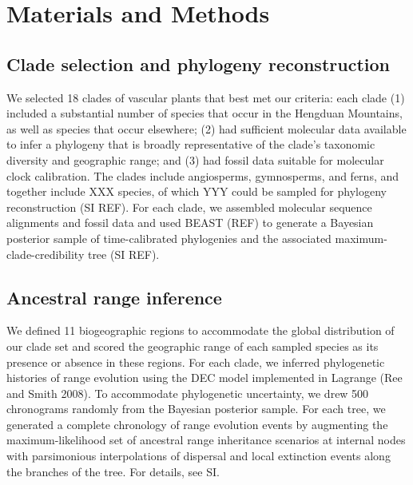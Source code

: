 \section{Materials and Methods}

\subsection{Clade selection and phylogeny reconstruction}

We selected 18 clades of vascular plants that best met our criteria: each clade (1) included a substantial number of species that occur in the Hengduan Mountains, as well as species that occur elsewhere; (2) had sufficient molecular data available to infer a phylogeny that is broadly representative of the clade's taxonomic diversity and geographic range; and (3) had fossil data suitable for molecular clock calibration. The clades include angiosperms, gymnosperms, and ferns, and together include XXX species, of which YYY could be sampled for phylogeny reconstruction (SI REF). For each clade, we assembled molecular sequence alignments and fossil data and used BEAST (REF) to generate a Bayesian posterior sample of time-calibrated phylogenies and the associated maximum-clade-credibility tree (SI REF).

\subsection{Ancestral range inference}

We defined 11 biogeographic regions to accommodate the global distribution of our clade set and scored the geographic range of each sampled species as its presence or absence in these regions. For each clade, we inferred phylogenetic histories of range evolution using the DEC model implemented in Lagrange (Ree and Smith 2008). To accommodate phylogenetic uncertainty, we drew 500 chronograms randomly from the Bayesian posterior sample. For each tree, we generated a complete chronology of range evolution events by augmenting the maximum-likelihood set of ancestral range inheritance scenarios at internal nodes with parsimonious interpolations of dispersal and local extinction events along the branches of the tree. For details, see SI.